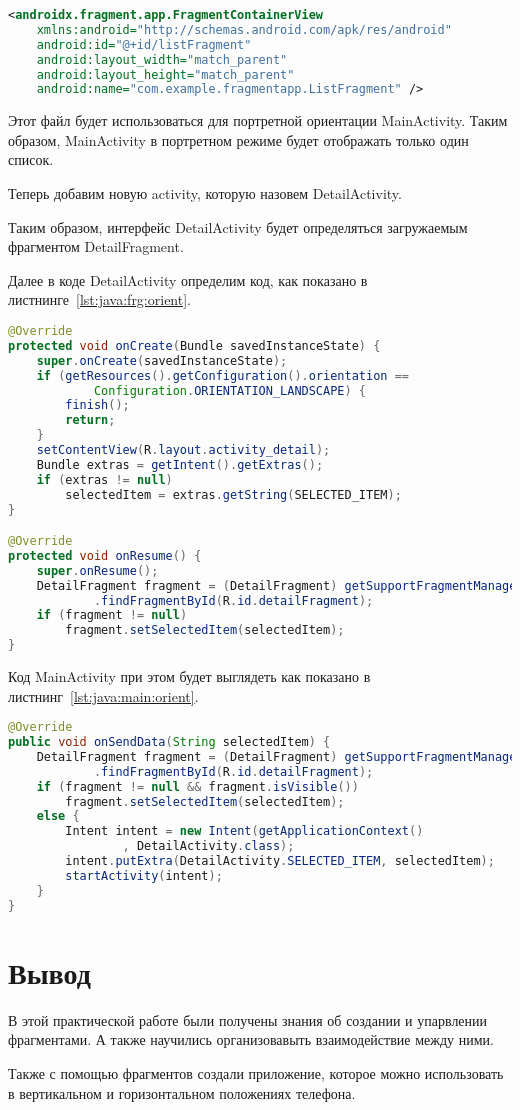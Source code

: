 \begin{lstlisting}[language=XML
	, caption=\leftline{}
	, label=lst:xml:actwthfrg
	]
<androidx.fragment.app.FragmentContainerView
	xmlns:android="http://schemas.android.com/apk/res/android"
	android:id="@+id/listFragment"
	android:layout_width="match_parent"
	android:layout_height="match_parent"
	android:name="com.example.fragmentapp.ListFragment" />
\end{lstlisting}

Этот файл будет использоваться для портретной ориентации MainActivity.
Таким образом, MainActivity в портретном режиме будет отображать только
один список.\par
Теперь добавим новую activity, которую назовем DetailActivity.\par
Таким образом, интерфейс DetailActivity будет определяться загружаемым
фрагментом DetailFragment.\par
Далее в коде DetailActivity определим код, как показано
в листнинге~\ref{lst:java:frg:orient}.

\begin{lstlisting}[language=Java
	, caption=\leftline{}
	, label=lst:java:frg:orient
	]
@Override
protected void onCreate(Bundle savedInstanceState) {
	super.onCreate(savedInstanceState);
	if (getResources().getConfiguration().orientation ==
			Configuration.ORIENTATION_LANDSCAPE) {
		finish();
		return;
	}
	setContentView(R.layout.activity_detail);
	Bundle extras = getIntent().getExtras();
	if (extras != null)
		selectedItem = extras.getString(SELECTED_ITEM);
}

@Override
protected void onResume() {
	super.onResume();
	DetailFragment fragment = (DetailFragment) getSupportFragmentManager()
			.findFragmentById(R.id.detailFragment);
	if (fragment != null)
		fragment.setSelectedItem(selectedItem);
}
\end{lstlisting}

Код MainActivity при этом будет выглядеть как показано
в листнинг~\ref{lst:java:main:orient}.

\begin{lstlisting}[language=Java
	, caption=\leftline{}
	, label=lst:java:main:orient
	]
@Override
public void onSendData(String selectedItem) {
	DetailFragment fragment = (DetailFragment) getSupportFragmentManager()
			.findFragmentById(R.id.detailFragment);
	if (fragment != null && fragment.isVisible())
		fragment.setSelectedItem(selectedItem);
	else {
		Intent intent = new Intent(getApplicationContext()
				, DetailActivity.class);
		intent.putExtra(DetailActivity.SELECTED_ITEM, selectedItem);
		startActivity(intent);
	}
}
\end{lstlisting}

\clearpage

\section*{\LARGE{Вывод}}
В этой практической работе были получены знания об создании и
упарвлении фрагментами. А также научились организовавыть взаимодействие
между ними.\par
Также с помощью фрагментов создали приложение, которое можно использовать
в вертикальном и горизонтальном положениях телефона.

